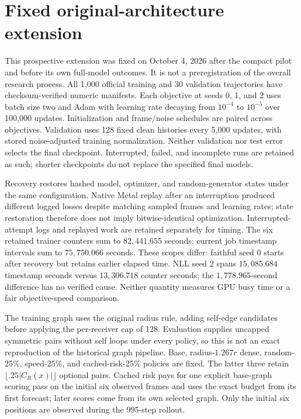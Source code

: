\section{Fixed original-architecture extension}
\label{sec:full-protocol}
This prospective extension was fixed on October 4, 2026 after the compact pilot
and before its own full-model outcomes. It is not a preregistration of the
overall research process. All 1,000 official training and 30 validation
trajectories have checksum-verified numeric manifests. Each objective at seeds
0, 1, and 2 uses batch size two and Adam with learning rate decaying from
$10^{-4}$ to $10^{-5}$ over 100,000 updates. Initialization and frame/noise
schedules are paired across objectives. Validation uses 128 fixed clean
histories every 5,000 updates, with stored noise-adjusted training normalization.
Neither validation nor test error selects the final checkpoint. Interrupted,
failed, and incomplete runs are retained as such; shorter checkpoints do not
replace the specified final models.

Recovery restores hashed model, optimizer, and random-generator states under
the same configuration. Native Metal replay after an interruption produced
different logged losses despite matching sampled frames and learning rates;
state restoration therefore does not imply bitwise-identical optimization.
Interrupted-attempt logs and replayed work are retained separately for timing.
The six retained trainer counters sum to $82{,}441.655$ seconds; current
job timestamp intervals sum to $75{,}750.066$ seconds. These scopes differ:
faithful seed 0 starts after recovery but retains earlier elapsed time.
NLL seed 2 spans $15{,}085.684$ timestamp seconds versus $13{,}306.718$
counter seconds; the $1{,}778.965$-second difference has no verified cause.
Neither quantity measures GPU busy time or a fair objective-speed comparison.

The training graph uses the original radius rule, adding self-edge candidates before applying the per-receiver cap of 128.
Evaluation supplies uncapped symmetric pairs without self loops under every
policy, so this is not an exact reproduction of the historical graph pipeline.
Base, radius-$1.267r$ dense, random-25\%, speed-25\%, and cached-risk-25\%
policies are fixed. The latter three retain
$\lfloor.25|C_R(x)|\rfloor$ optional pairs. Cached risk pays for one explicit
base-graph scoring pass on the initial six observed frames and uses the exact
budget from its first forecast; later scores come from its own selected graph.
Only the initial six positions are observed during the 995-step rollout.

